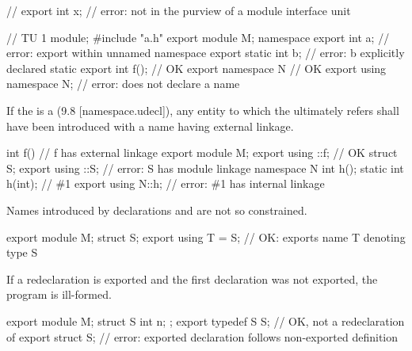 \begin{std.txt}
  \alinea
  \begin{example}
  \begin{after}\color{addclr}
    \begin{codeblock}
      // 
      export int x;             // error: not in the purview of a module interface unit

      // TU 1
      module;
      #include "a.h"
      export module M;
      namespace {
        export int a;           // error: export within unnamed namespace
      }
      export static int b;      // error: b explicitly declared static
      export int f();           // OK
      export namespace N { }    // OK
      export using namespace N; // error: does not declare a name
    \end{codeblock}
  \end{after}
  \end{example}

  \alinea
  If the  is a 
  (9.8 [namespace.udecl]), any entity to which the
   ultimately refers shall have been introduced
  with a name having external linkage.
  \begin{example}
    \begin{codeblock}
      int f()               // f has external linkage
      export module M;
      export using ::f;     // OK
      struct S;
      export using ::S;     // error: S has module linkage
      namespace N {
        int h();
        static int h(int);  // \#1
      }
      export using N::h;    // error: \#1 has internal linkage
    \end{codeblock}
  \end{example}
  \enternote
  Names introduced by  declarations
  and 
  are not so constrained.
  \begin{example}
    \begin{codeblock}
      export module M;
      struct S;
      export using T = S;   // OK: exports name T denoting type S
    \end{codeblock}
  \end{example}
  \exitnote

  \begin{after}\color{addclr}
  \alinea
  If a redeclaration is exported
  and the first declaration was not exported,
  the program is ill-formed.
  \begin{example}
  \begin{codeblock}
  export module M;
  struct S { int n; };
  export typedef S S;   // OK, not a redeclaration of 
  export struct S;      // error: exported declaration follows non-exported definition
  \end{codeblock}
  \end{example}
  \end{after}


\end{std.txt}
